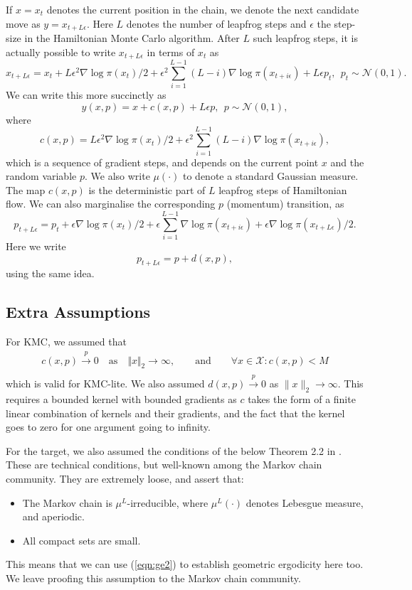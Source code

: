 \documentclass{article}
\newcommand{\X}{\mathcal{X}}
\begin{document}
If $x = x_t$ denotes the current position in the chain, we denote the next candidate move as $y = x_{t+L\epsilon}$.  Here $L$ denotes the number of leapfrog steps and $\epsilon$ the step-size in the Hamiltonian Monte Carlo algorithm.  After $L$ such leapfrog steps, it is actually possible to write $x_{t+L\epsilon}$ in terms of $x_t$ as  
\[
x_{t+L\epsilon} = x_t + L\epsilon^2 \nabla\log\pi(x_t)/2 + \epsilon^2 \sum_{i=1}^{L-1} (L-i) \nabla\log\pi(x_{t+i\epsilon}) + L\epsilon p_t, ~~ p_t \sim \mathcal{N}(0,1).
\]
We can write this more succinctly as
\[
y(x,p) = x + c(x,p) + L\epsilon p, ~~ p \sim \mathcal{N}(0,1),
\]
where 
\[
c(x,p) = L\epsilon^2 \nabla\log\pi(x_t)/2 + \epsilon^2 \sum_{i=1}^{L-1} (L-i) \nabla\log\pi(x_{t+i\epsilon}),
\]
which is a sequence of gradient steps, and depends on the current point $x$ and the random variable $p$.  We also write $\mu(\cdot)$ to denote a standard Gaussian measure.  The map
$c(x,p)$ is the deterministic part of $L$ leapfrog steps of Hamiltonian flow.  We can also marginalise the corresponding $p$ (momentum) transition, as
\[
p_{t+L\epsilon} = p_t + \epsilon \nabla\log\pi(x_t)/2 + \epsilon \sum_{i=1}^{L-1} \nabla\log\pi(x_{t+i\epsilon}) + \epsilon \nabla\log\pi(x_{t+L\epsilon})/2.
\]
Here we write
\[
p_{t+L\epsilon} = p + d(x,p),
\]
using the same idea.



\subsection{Extra Assumptions}

For KMC, we assumed that
\begin{align*}
c(x,p) \xrightarrow{p} 0 \quad\text{as}\quad \Vert x\Vert _2 \to \infty, \qquad\text{and}\qquad \forall x \in \X:  c(x,p) < M\\
\end{align*}
which is valid for KMC-lite. We also assumed $d(x,p)\xrightarrow{p} 0$ as $\|x\|_2 \to \infty$. This requires a bounded kernel with bounded gradients as $c$ takes the form of a finite linear combination of kernels and their gradients, and the fact that the kernel goes to zero for one argument going to infinity.

For the target, we also assumed the conditions of the below Theorem 2.2 in \cite{roberts1996geometric}.  These are technical conditions, but well-known among the Markov chain community.  They are extremely loose, and assert that:
\begin{itemize}
\item The Markov chain is $\mu^L$-irreducible, where $\mu^L(\cdot)$ denotes Lebesgue measure, and aperiodic.
\item All compact sets are small.
\end{itemize}
This means that we can use (\ref{eqn:ge2}) to establish geometric ergodicity here too. We leave proofing this assumption to the Markov chain community.
\end{document}
